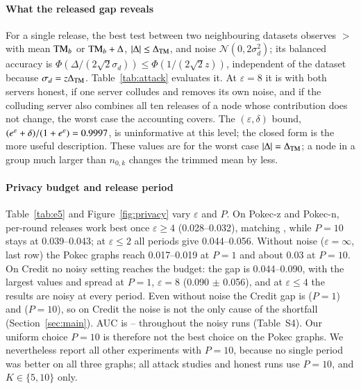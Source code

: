 \paragraph{What the released gap reveals}
For a single release, the best test between two neighbouring datasets observes $\gt$ with mean $\mathrm{TM}_b$ or $\mathrm{TM}_b+\Delta$, $|\Delta|\le\Delta_{\mathrm{TM}}$, and noise $\mathcal{N}(0,2\sigma_d^2)$; its balanced accuracy is $\Phi(\Delta/(2\sqrt2\sigma_d))\le\Phi(1/(2\sqrt2 z))$, independent of the dataset because $\sigma_d=z\Delta_{\mathrm{TM}}$. Table~\ref{tab:attack} evaluates it. At $\varepsilon=8$ it is \accBothEight{} with both servers honest, \accOneEight{} if one server colludes and removes its own noise, and \accAllEight{} if the colluding server also combines all ten releases of a node whose contribution does not change, the worst case the accounting covers. The $(\varepsilon,\delta)$ bound, $(e^\varepsilon+\delta)/(1+e^\varepsilon)=0.9997$, is uninformative at this level; the closed form is the more useful description. These values are for the worst case $|\Delta|=\Delta_{\mathrm{TM}}$; a node in a group much larger than $n_{0,k}$ changes the trimmed mean by less.

\paragraph{Privacy budget and release period}
Table~\ref{tab:e5} and Figure~\ref{fig:privacy} vary $\varepsilon$ and $P$. On Pokec-z and Pokec-n, per-round releases work best once $\varepsilon\ge4$ (0.028--0.032), matching \clamp{}, while $P=10$ stays at 0.039--0.043; at $\varepsilon\le2$ all periods give 0.044--0.056. Without noise ($\varepsilon=\infty$, last row) the Pokec graphs reach 0.017--0.019 at $P=1$ and about 0.03 at $P=10$. On Credit no noisy setting reaches the budget: the gap is 0.044--0.090, with the largest values and spread at $P=1$, $\varepsilon=8$ (0.090 $\pm$ 0.056), and at $\varepsilon\le4$ the results are noisy at every period. Even without noise the Credit gap is \nfCreditPone{} ($P=1$) and \nfCreditPten{} ($P=10$), so on Credit the noise is not the only cause of the shortfall (Section~\ref{sec:main}). AUC is \eFiveAucMin--\eFiveAucMax{} throughout the noisy runs (Table~S4). Our uniform choice $P=10$ is therefore not the best choice on the Pokec graphs. We nevertheless report all other experiments with $P=10$, because no single period was better on all three graphs; all attack studies and honest runs use $P=10$, and $K\in\{5,10\}$ only.

